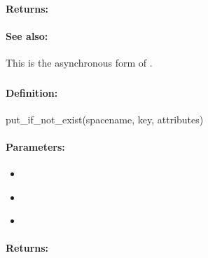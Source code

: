 \paragraph{Returns:}


\paragraph{See also:}  This is the asynchronous form of .

\pagebreak
\subsubsection{}
\label{api:ruby:put_if_not_exist}


\paragraph{Definition:}
\begin{rubycode}
put_if_not_exist(spacename, key, attributes)
\end{rubycode}

\paragraph{Parameters:}
\begin{itemize}[noitemsep]
\item {}\\

\item {}\\

\item {}\\

\end{itemize}

\paragraph{Returns:}


\pagebreak
\subsubsection{}
\label{api:ruby:async_put_if_not_exist}



